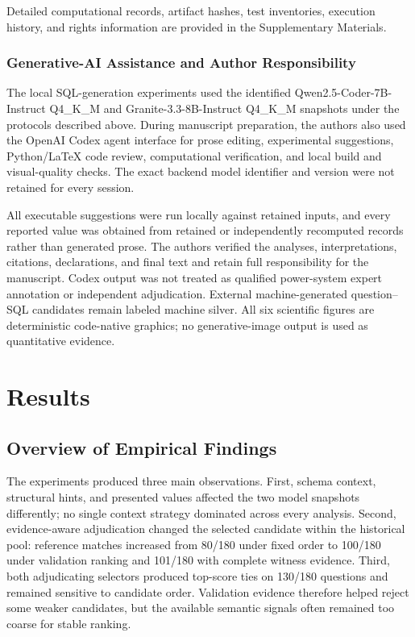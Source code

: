 \documentclass[applsci,article,submit,moreauthors]{Definitions/mdpi}
\begin{document}
Detailed computational records, artifact hashes, test inventories, execution history, and rights information are provided in the Supplementary Materials.

\subsubsection{Generative-AI Assistance and Author Responsibility}

The local SQL-generation experiments used the identified Qwen2.5-Coder-7B-Instruct Q4\_K\_M and Granite-3.3-8B-Instruct Q4\_K\_M snapshots under the protocols described above. During manuscript preparation, the authors also used the OpenAI Codex agent interface for prose editing, experimental suggestions, Python/\LaTeX{} code review, computational verification, and local build and visual-quality checks. The exact backend model identifier and version were not retained for every session.

All executable suggestions were run locally against retained inputs, and every reported value was obtained from retained or independently recomputed records rather than generated prose. The authors verified the analyses, interpretations, citations, declarations, and final text and retain full responsibility for the manuscript. Codex output was not treated as qualified power-system expert annotation or independent adjudication. External machine-generated question--SQL candidates remain labeled machine silver. All six scientific figures are deterministic code-native graphics; no generative-image output is used as quantitative evidence.

\section{Results}

\subsection{Overview of Empirical Findings}

The experiments produced three main observations. First, schema context, structural hints, and presented values affected the two model snapshots differently; no single context strategy dominated across every analysis. Second, evidence-aware adjudication changed the selected candidate within the historical pool: reference matches increased from 80/180 under fixed order to 100/180 under validation ranking and 101/180 with complete witness evidence. Third, both adjudicating selectors produced top-score ties on 130/180 questions and remained sensitive to candidate order. Validation evidence therefore helped reject some weaker candidates, but the available semantic signals often remained too coarse for stable ranking.
\end{document}
